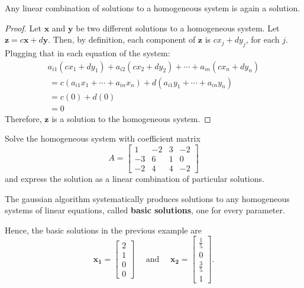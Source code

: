 \documentclass[20pt,a4paper]{extarticle}
\newcounter{example}[section]
\newcounter{theorem}
\newcounter{definition}[section]
\begin{document}
\begin{theorem}
Any linear combination of solutions to a homogeneous system is again a solution.
\end{theorem}

\begin{proof}
Let $\mathbf{x}$ and $\mathbf{y}$ be two different solutions to a homogeneous system. Let $\mathbf{z} = c\mathbf{x} + d\mathbf{y}$. Then, by definition, each component of $\mathbf{z}$ is $c x_j + d y_j$, for each $j$. Plugging that in each equation of the system:
	\begin{align*}
		a_{i1} (cx_1 + dy_1) + a_{i2} (cx_2 + dy_2) + \cdots + a_{in} (cx_n + dy_n) \\ 
		\, = c (a_{i1} x_1 + \cdots + a_{in} x_n) + d (a_{i1} y_1 + \cdots + a_{in} y_n) \\ 
		\, = c (0) + d(0) \qquad \qquad \qquad \qquad \qquad \qquad \qquad \quad \,\,\, \\ 
		\, = 0 \qquad \qquad \qquad \qquad \qquad \qquad \qquad \qquad \qquad \quad \,\,\,\,\,
	\end{align*}
Therefore, $\mathbf{z}$ is a solution to the homogeneous system.
\end{proof}

\newpage 

\begin{example}
Solve the homogeneous system with coefficient matrix
	\[
		A = \begin{bmatrix} 1 & -2 & 3 & -2 \\ -3 & 6 & 1 & 0 \\ -2 & 4 & 4 & -2 \end{bmatrix}
	\]
and express the solution as a linear combination of particular solutions.
\end{example}

\begin{solution}

\end{solution}

\newpage 

\phantom{2}

\vfill

\begin{definition}
The gaussian algorithm systematically produces solutions to any homogeneous systems of linear equations, called \textbf{basic solutions}, one for every parameter.
\end{definition}

Hence, the basic solutions in the previous example are
	\[
		\mathbf{x_1} = \begin{bmatrix} 2 \\ 1 \\ 0 \\ 0 \end{bmatrix} \quad \text{ and } \quad \mathbf{x_2} = \begin{bmatrix} \frac{1}{5} \\ 0 \\ \frac{3}{5} \\ 1 \end{bmatrix} .
	\]
\end{document}
